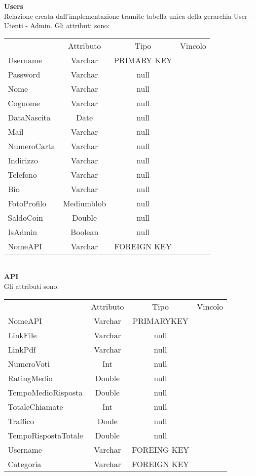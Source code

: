 {{		\textbf{Users}\\
			Relazione creata dall'implementazione tramite tabella unica della gerarchia User - Utenti - Admin. Gli attributi sono:
			\begin{center}
			\begin{tabular}{lccc}
				&Attributo&Tipo&Vincolo\\
				Username&Varchar&PRIMARY KEY\\
				Password&Varchar&null \\				
				Nome&Varchar&null \\
				Cognome&Varchar&null \\
				DataNascita&Date&null \\				
				Mail&Varchar&null \\
				NumeroCarta&Varchar&null \\
				Indirizzo&Varchar&null \\
				Telefono&Varchar&null \\
				Bio&Varchar&null \\
				FotoProfilo&Mediumblob&null\\
				SaldoCoin&Double&null \\
				IsAdmin&Boolean&null \\
				NomeAPI&Varchar&FOREIGN KEY\\
			\end{tabular}
			\end{center} \\					
			
		\textbf{API}\\
			Gli attributi sono:
			\begin{center}
			\begin{tabular}{lccc}
				&Attributo&Tipo&Vincolo\\
				NomeAPI&Varchar&PRIMARYKEY\\
				LinkFile&Varchar&null \\
				LinkPdf&Varchar&null \\
				NumeroVoti&Int&null \\
				RatingMedio&Double&null \\
				TempoMedioRisposta&Double&null \\
				TotaleChiamate&Int&null \\
				Traffico&Doule&null \\
				TempoRispostaTotale&Double&null \\
				Username&Varchar&FOREING KEY\\
				Categoria&Varchar&FOREIGN KEY\\
			\end{tabular}
			\end{center}\\
			
}}
